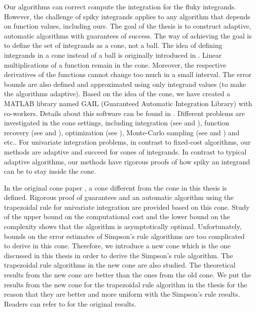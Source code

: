 \documentclass{iitthesis}
\theoremstyle{definition}
\theoremstyle{remark}
\begin{document}
Our algorithms can correct compute the integration for the fluky integrands. However, the challenge of spiky integrands applies to any algorithm that depends on function values, including ours. The goal of the thesis is to construct adaptive, automatic algorithms with guarantees of success. The way of achieving the goal is to define the set of integrands as a cone, not a ball. The idea of defining integrands in a cone instead of a ball is originally introduced in \cite{HicEtal14b}. Linear multiplications of a function remain in the cone. Moreover, the respective derivatives of the functions cannot change too much in a small interval. The error bounds are also defined and approximated using only integrand values (to make the algorithms adaptive). Based on the idea of the cone, we have created a MATLAB library named GAIL (Guaranteed Automatic Integration Library)\cite{ChoEtal17b} with co-workers. Details about this software can be found in \cite{Gail_ug}. Different problems are investigated in the cone settings, including integration (see \cite{HicJim16a} and \cite{JimHic16a}), function recovery (see \cite{DinHicWoz17a} and \cite{ChoEtal17a}), optimization (see \cite{ChoEtal17a}), Monte-Carlo sampling (see \cite{HicEtal14a} and \cite{JiaHic16a}) and etc.. For univariate integration problems, in contrast to fixed-cost algorithms, our methods are adaptive and succeed for cones of integrands. In contrast to typical adaptive algorithms, our methods have rigorous proofs of how spiky an integrand can be to stay inside the cone.

In the original cone paper \cite{HicEtal14b}, a cone different from the cone in this thesis is defined. Rigorous proof of guarantees and an automatic algorithm using the trapezoidal rule for univariate integration are provided based on this cone. Study of the upper bound on the computational cost and the lower bound on the complexity shows that the algorithm is asymptotically optimal. Unfortunately, bounds on the error estimates of Simpson's rule algorithms are too complicated to derive in this cone. Therefore, we introduce a new cone which is the one discussed in this thesis in order to derive the Simpson's rule algorithm. The trapezoidal rule algorithms in the new cone are also studied. The theoretical results from the new cone are better than the ones from the old cone. We put the results from the new cone for the trapezoidal rule algorithm in the thesis for the reason that they are better and more uniform with the Simpson's rule results. Readers can refer to \cite[Algo 4, Thm 7, Thm 8]{HicEtal14b} for the original results.
\end{document}
